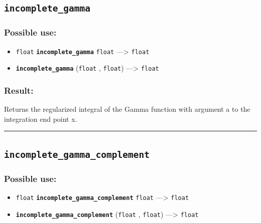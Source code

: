 \documentclass[]{book}
\providecommand{\tightlist}{%
  \setlength{\itemsep}{0pt}\setlength{\parskip}{0pt}}
\theoremstyle{definition}
\theoremstyle{definition}
\theoremstyle{definition}
\theoremstyle{remark}
\begin{document}
\subsection{\texorpdfstring{\texttt{incomplete\_gamma}}{incomplete\_gamma}}\label{incomplete_gamma}

\subsubsection{Possible use:}\label{possible-use-270}

\begin{itemize}
\tightlist
\item
  \texttt{float} \textbf{\texttt{incomplete\_gamma}} \texttt{float}
  ---\textgreater{} \texttt{float}
\item
  \textbf{\texttt{incomplete\_gamma}} (\texttt{float} , \texttt{float})
  ---\textgreater{} \texttt{float}
\end{itemize}

\subsubsection{Result:}\label{result-260}

Returns the regularized integral of the Gamma function with argument a
to the integration end point x.

\begin{center}\rule{0.5\linewidth}{\linethickness}\end{center}

\subsection{\texorpdfstring{\texttt{incomplete\_gamma\_complement}}{incomplete\_gamma\_complement}}\label{incomplete_gamma_complement}

\subsubsection{Possible use:}\label{possible-use-271}

\begin{itemize}
\tightlist
\item
  \texttt{float} \textbf{\texttt{incomplete\_gamma\_complement}}
  \texttt{float} ---\textgreater{} \texttt{float}
\item
  \textbf{\texttt{incomplete\_gamma\_complement}} (\texttt{float} ,
  \texttt{float}) ---\textgreater{} \texttt{float}
\end{itemize}
\end{document}
